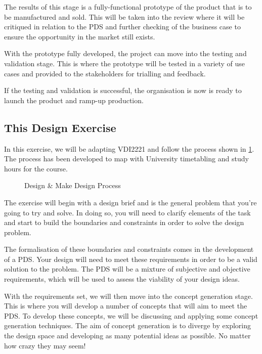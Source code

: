 The results of this stage is a fully-functional prototype of the product that is to be manufactured and sold. This will be taken into the review where it will be critiqued in relation to the PDS and further checking of the business case to ensure the opportunity in the market still exists.

With the prototype fully developed, the project can move into the testing and validation stage. This is where the prototype will be tested in a variety of use cases and provided to the stakeholders for trialling and feedback.

If the testing and validation is successful, the organisation is now is ready to launch the product and ramp-up production.


\subsection{This Design Exercise}

In this exercise, we will be adapting \ac{VDI2221} and follow the process shown in \cref{fig-dm-process}. The process has been developed to map with University timetabling and study hours for the course.

\begin{figure}[h!]
  \centering
  \resizebox{0.8\textwidth}{!}{
    \small
    
  }
  \caption{Design \& Make Design Process}\label{fig-dm-process}
\end{figure}

The exercise will begin with a design brief and is the general problem that you're going to try and solve. In doing so, you will need to clarify elements of the task and start to build the boundaries and constraints in order to solve the design problem.

The formalisation of these boundaries and constraints comes in the development of a \acf{PDS}. Your design will need to meet these requirements in order to be a valid solution to the problem. The PDS will be a mixture of subjective and objective requirements, which will be used to assess the viability of your design ideas. 

With the requirements set, we will then move into the concept generation stage. This is where you will develop a number of concepts that will aim to meet the PDS. To develop these concepts, we will be discussing and applying some concept generation techniques. The aim of concept generation is to diverge by exploring the design space and developing as many potential ideas as possible. No matter how crazy they may seem!


